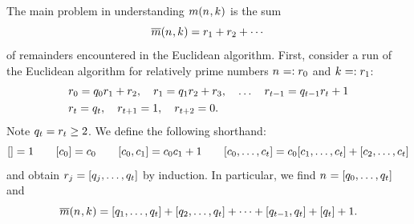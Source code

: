  
  The main problem in understanding $\MovesOf{\Size}{\Shift}$ is
  the sum
  \begin{equation}\label{def-mbar}
    \RemainderSumOf{\Size}{\Shift}
    =
    \Remainder[1]+\Remainder[2]+\cdots
  \end{equation}
  of remainders encountered in the Euclidean algorithm.  First,
  consider a run of the Euclidean algorithm for relatively prime numbers
  $\Size=:\Remainder[0]$ and $\Shift=:\Remainder[1]$:
  \begin{align*}
 &   \Remainder[0]  = \Quotient[0] \Remainder[1] + \Remainder[2], \quad 
    \Remainder[1]  = \Quotient[1] \Remainder[2] + \Remainder[3] , \quad \ldots \quad 
    \Remainder[\LastIndex-1] = \Quotient[\LastIndex-1]\Remainder[\LastIndex] + 1 \\
  &  \Remainder[\LastIndex] = \Quotient[\LastIndex], \quad 
    \Remainder[\LastIndex+1] = 1, \quad 
    \Remainder[\LastIndex+2] = 0
                               .  \end{align*}
  Note $\Quotient[\LastIndex]=\Remainder[\LastIndex]\geq 2$. We define the following shorthand:
  \[
    \ExpansionOf{} = 1\qquad
    \ExpansionOf{\Entry[0]} = \Entry[0]\qquad
    \ExpansionOf{\Entry[0],\Entry[1]} = \Entry[0]\Entry[1] + 1 \qquad
    \ExpansionOf{\Entry[0],\ldots,\Entry[\LastIndex]}
    = \Entry[0]\ExpansionOf{\Entry[1],\ldots,\Entry[\LastIndex]}
    + \ExpansionOf{\Entry[2],\ldots,\Entry[\LastIndex]}
  \]
  and obtain
  \(
    \Remainder[\TheIndex] = \ExpansionOf{\Quotient[\TheIndex],\ldots,\Quotient[\LastIndex]}
  \)
  by induction. In particular, we find
  \(
    \Size = \ExpansionOf{\Quotient[0],\ldots,\Quotient[\LastIndex]}
  \)
  and
  \begin{equation}\label{eq.RemainderSum}
    \RemainderSumOf{\Size}{\Shift}
    =
    \ExpansionOf{\Quotient[1],\ldots,\Quotient[\LastIndex]}
    +
    \ExpansionOf{\Quotient[2],\ldots,\Quotient[\LastIndex]}
    +\cdots+
    \ExpansionOf{\Quotient[\LastIndex-1],\Quotient[\LastIndex]}
    +
    \ExpansionOf{\Quotient[\LastIndex]}
    + 1
    .
  \end{equation}

